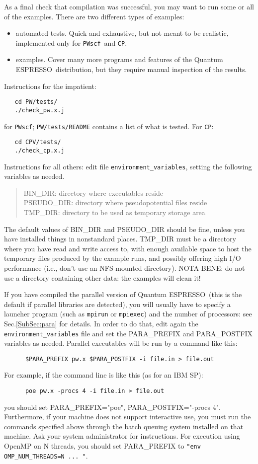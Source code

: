 \documentclass[12pt,a4paper]{article}
\def\qe{{\sc Quantum ESPRESSO}}
\def\PWscf{\texttt{PWscf}}
\def\CP{\texttt{CP}}
\begin{document}
As a final check that compilation was successful, you may want to run some or
all of the examples. There are two different types of examples: 
\begin{itemize}
\item automated tests. Quick and exhaustive, but not
meant to be realistic, implemented only for \PWscf\ and \CP.
\item examples.
Cover many more programs and features of the \qe\ distribution,
but they require manual inspection of the results. 
\end{itemize}
Instructions for the impatient:
\begin{verbatim}
   cd PW/tests/
   ./check_pw.x.j
\end{verbatim}
for \PWscf;
\texttt{PW/tests/README} contains a list of what is tested.
For \CP:
\begin{verbatim}
   cd CPV/tests/
   ./check_cp.x.j
\end{verbatim}
Instructions for all others: edit file \texttt{environment\_variables},
setting the following variables as needed.
\begin{quote}
   BIN\_DIR: directory where executables reside\\
   PSEUDO\_DIR: directory where pseudopotential files reside\\
   TMP\_DIR: directory to be used as temporary storage area
\end{quote}
The default values of BIN\_DIR and PSEUDO\_DIR should be fine, 
unless you have installed things in nonstandard places. TMP\_DIR 
must be a directory where you have read and write access to, with 
enough available space to host the temporary files produced by the 
example runs, and possibly offering high I/O performance (i.e., don't 
use an NFS-mounted directory). NOTA BENE: do not use a
directory containing other data: the examples will clean it!

If you have compiled the parallel version of \qe\ (this
is the default if parallel libraries are detected), you will usually
have to specify a launcher program (such as \texttt{mpirun} or 
\texttt{mpiexec}) and the number of processors: see Sec.\ref{SubSec:para} for
details. In order to do that, edit again the \texttt{environment\_variables} 
file
and set the PARA\_PREFIX and PARA\_POSTFIX variables as needed. 
Parallel executables will be run by a command like this: 
\begin{verbatim}
      $PARA_PREFIX pw.x $PARA_POSTFIX -i file.in > file.out
\end{verbatim}
For example, if the command line is like this (as for an IBM SP):
\begin{verbatim}
      poe pw.x -procs 4 -i file.in > file.out
\end{verbatim}
you should set PARA\_PREFIX="poe", PARA\_POSTFIX="-procs
4". Furthermore, if your machine does not support interactive use, you
must run the commands specified above through the batch queuing
system installed on that machine. Ask your system administrator for
instructions. For execution using OpenMP on N threads, 
you should set PARA\_PREFIX to \texttt{"env OMP\_NUM\_THREADS=N ... "}.
\end{document}
